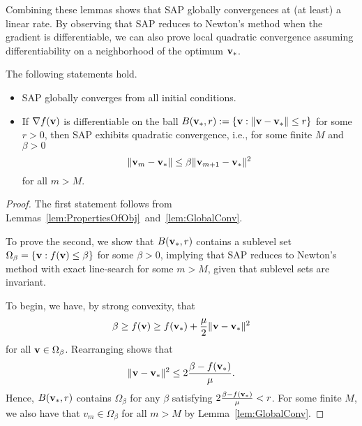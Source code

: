 Combining these lemmas shows that SAP globally convergences at (at least) a
linear rate.  By observing that SAP reduces to Newton's
method when the gradient is differentiable, we can also prove local quadratic
convergence assuming differentiability on a neighborhood of
the optimum ${\mathbf{v}}_*$. 
\begin{theorem}
  The following statements hold.
  \begin{itemize}
    \item SAP globally converges from all initial conditions.
    \item If $\nabla f({\mathbf{v}})$  is differentiable on the ball $B({\mathbf{v}}_*, r) := \{ {\mathbf{v}} :  \|{\mathbf{v}}-{\mathbf{v}}_*\| \le r\}$
  for some $r > 0$, then SAP exhibits quadratic convergence, i.e., for some finite
  $M$ and $\beta > 0$
  \[
    \|{\mathbf{v}}_m - {\mathbf{v}}_*\| \le \beta \|{\mathbf{v}}_{m+1} - {\mathbf{v}}_*\|^2
  \]
  for all $m > M$.
  \end{itemize}

  \begin{proof}

    The first statement follows from Lemmas~\ref{lem:PropertiesOfObj}~and~\ref{lem:GlobalConv}.

  To prove the second, we show that $B({\mathbf{v}}_*, r)$
    contains a sublevel set $\Omega_{\beta} = \{ {\mathbf{v}} : f({\mathbf{v}}) \le \beta\}$ for some
  $\beta > 0$,  implying that SAP 
  reduces to Newton's method with exact line-search for some $m > M$,
 given that sublevel sets are invariant. 

  To begin, we have, by strong convexity, that
  \begin{equation}
    \beta \ge f(\vx) \ge f(\vx_*)  + \frac{\mu}{2} \|\vx-\vx_*\|^2
    \label{eq:strong_convexity_at_differentiable_optimal}
  \end{equation}
    for all ${\mathbf{v}} \in \Omega_{\beta}$.
    Rearranging shows that
    \[
      \|{\mathbf{v}}-{\mathbf{v}}_*\|^2 \le 2\frac{\beta- f({\mathbf{v}}_*)}{\mu}.
    \]
    Hence, $B({\mathbf{v}}_*, r)$ contains
    $\Omega_{\beta}$ for any $\beta$ satisfying $2\frac{\beta- f({\mathbf{v}}_*)}{\mu} < r$.
    For some finite $M$, we also have that $v_m \in \Omega_{\beta}$ for all $m > M$ 
    by Lemma~\ref{lem:GlobalConv}.


\end{proof}
\end{theorem}
